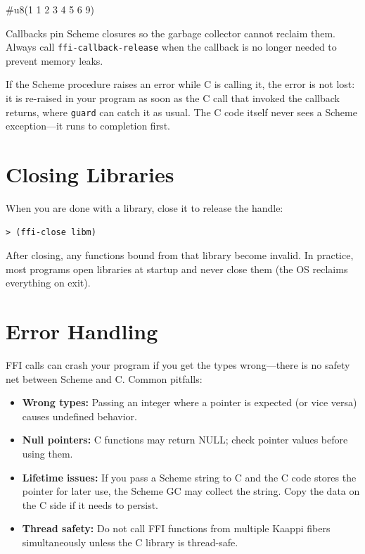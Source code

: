 \begin{codeoutput}
\#u8(1 1 2 3 4 5 6 9)
\end{codeoutput}

\begin{warning}
Callbacks pin Scheme closures so the garbage collector cannot reclaim them. Always call \texttt{ffi-callback-release} when the callback is no longer needed to prevent memory leaks.
\end{warning}

If the Scheme procedure raises an error while C is calling it, the error is not lost: it is re-raised in your program as soon as the C call that invoked the callback returns, where \texttt{guard} can catch it as usual. The C code itself never sees a Scheme exception---it runs to completion first.

\section{Closing Libraries}

When you are done with a library, close it to release the handle:

\begin{lstlisting}[style=repl]
> (ffi-close libm)
\end{lstlisting}

After closing, any functions bound from that library become invalid. In practice, most programs open libraries at startup and never close them (the OS reclaims everything on exit).

\section{Error Handling}

FFI calls can crash your program if you get the types wrong---there is no safety net between Scheme and C. Common pitfalls:

\begin{itemize}
    \item \textbf{Wrong types:} Passing an integer where a pointer is expected (or vice versa) causes undefined behavior.
    \item \textbf{Null pointers:} C functions may return NULL; check pointer values before using them.
    \item \textbf{Lifetime issues:} If you pass a Scheme string to C and the C code stores the pointer for later use, the Scheme GC may collect the string. Copy the data on the C side if it needs to persist.
    \item \textbf{Thread safety:} Do not call FFI functions from multiple Kaappi fibers simultaneously unless the C library is thread-safe.
\end{itemize}

